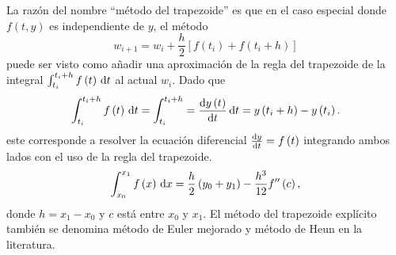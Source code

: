 La razón del nombre ``método del trapezoide'' es que en el caso especial donde
$f\left(t,y\right)$ es independiente de $y$, el método
\begin{equation*}
    w_{i+1}=
    w_{i}+
    \frac{h}{2}
    \left[
        f\left(t_{i}\right)+
        f\left(t_{i}+h\right)
        \right]
\end{equation*}
puede ser visto como añadir una aproximación de la regla del
trapezoide de la integral
\begin{math}
    \int_{t_{i}}^{t_{i}+h}
    f\left(t\right)\dl t
\end{math}
al actual $w_{i}$.
Dado que
\begin{equation*}
    \int_{t_{i}}^{t_{i}+h}
    f\left(t\right)\dl t=
    \int_{t_{i}}^{t_{i}+h}=
    \diff{y\left(t\right)}{t}\dl t=
    y\left(t_{i}+h\right)-y\left(t_{i}\right).
\end{equation*}
este corresponde a resolver la ecuación diferencial
$\diff{y}{t}=f\left(t\right)$ integrando ambos lados con el uso de
la regla del trapezoide.
\begin{equation*}
    \int_{x_{0}}^{x_{1}}
    f\left(x\right)
    \dl x=
    \frac{h}{2}\left(y_{0}+y_{1}\right)-
    \frac{h^{3}}{12}f^{\prime\prime}\left(c\right),
\end{equation*}
donde $h=x_{1}-x_{0}$ y $c$ está entre $x_{0}$ y $x_{1}$.
El método del trapezoide explícito también se denomina método de
Euler mejorado y método de Heun en la literatura.

